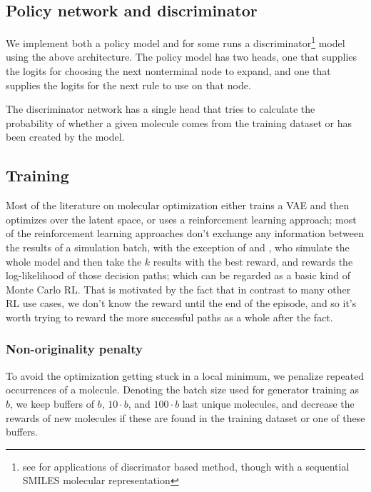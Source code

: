 \documentclass{article}
\begin{document}
\subsection{Policy network and discriminator}
We implement both a policy model and for some runs a discriminator\footnote{see \cite{guimaraes2017, sanchezlengeling2017, putin2018} for applications of discrimator based method, though with a sequential SMILES molecular representation} model using the above architecture. The policy model has two heads, one that supplies the logits for choosing the next nonterminal node to expand, and one that supplies the logits for the next rule to use on that node.

The discriminator network has a single head that tries to calculate the probability of whether a given molecule comes from the training dataset or has been created by the model.

\subsection{Training}\label{sec:training}
Most of the literature on molecular optimization either trains a VAE and then optimizes over the latent space, or uses a reinforcement learning approach; most of the reinforcement learning approaches don't exchange any information between the results of a simulation batch, with the exception of \cite{segler2017, neil2018} and \cite{kraev2018}, who simulate the whole model and then take the $k$ results with the best reward, and rewards the log-likelihood of those decision paths; which can be regarded as a basic kind of Monte Carlo RL. That is motivated by the fact that in contrast to many other RL use cases, we don't know the reward until the end of the episode, and so it's worth trying to reward the more successful paths as a whole after the fact.

\subsubsection{Non-originality penalty}
To avoid the optimization getting stuck in a local minimum, we penalize repeated occurrences of a molecule. Denoting the batch size used for generator training as $b$, we keep buffers of $b$, $10\cdot b$, and $100\cdot b$ last unique molecules, and decrease the rewards of new molecules if these are found in the training dataset or one of these buffers.
\end{document}
